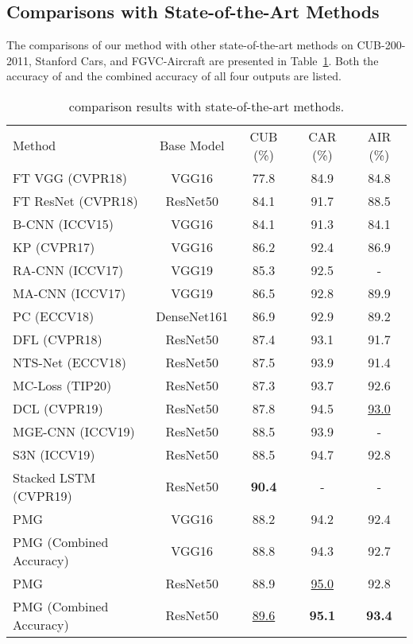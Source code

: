 \documentclass{llncs}
\begin{document}
\subsection{Comparisons with State-of-the-Art Methods}\label{ssec:sota}
The comparisons of our method with other state-of-the-art methods on CUB-200-2011, Stanford Cars, and FGVC-Aircraft are presented in Table~\ref{table:comparison}. Both the accuracy of  and the combined accuracy of all four outputs are listed.

\setlength{\tabcolsep}{4pt}
\begin{table}[!t]
\begin{center}
\caption{comparison results with state-of-the-art methods.}
\label{table:comparison}
\begin{tabular}{lcccc}
\hline\noalign{\smallskip}
Method & Base Model & CUB (\%) & CAR (\%) & AIR (\%)\\
\noalign{\smallskip}
\hline
\noalign{\smallskip}
FT VGG (CVPR18) \cite{wang2018learning} & VGG16 & 77.8 & 84.9 & 84.8\\
FT ResNet (CVPR18) \cite{wang2018learning} & ResNet50 & 84.1 & 91.7 & 88.5\\
B-CNN (ICCV15) \cite{lin2015bilinear} & VGG16 & 84.1 & 91.3 & 84.1\\
KP (CVPR17) \cite{cui2017kernel} & VGG16 & 86.2 & 92.4 & 86.9\\
RA-CNN (ICCV17) \cite{fu2017look} & VGG19 & 85.3 & 92.5 & -\\
MA-CNN (ICCV17) \cite{zheng2017learning} & VGG19 & 86.5 & 92.8 & 89.9\\
PC (ECCV18) \cite{dubey2018pairwise} & DenseNet161 & 86.9 & 92.9 & 89.2\\
DFL (CVPR18) \cite{wang2018learning} & ResNet50 & 87.4 & 93.1 & 91.7\\
NTS-Net (ECCV18) \cite{yang2018learning} & ResNet50 & 87.5 & 93.9 & 91.4\\
MC-Loss (TIP20) \cite{chang2019the} & ResNet50 & 87.3 & 93.7 & 92.6\\
DCL (CVPR19) \cite{chen2019destruction} & ResNet50 & 87.8 & 94.5 & \underline{93.0}\\
MGE-CNN (ICCV19) \cite{zhang2019learning} & ResNet50 & 88.5 & 93.9 & -\\
S3N (ICCV19) \cite{ding2019selective} & ResNet50 & 88.5 & 94.7 & 92.8\\
Stacked LSTM (CVPR19) \cite{ge2019weakly} & ResNet50 & {\bf 90.4} & - & -\\
\hline
PMG & VGG16 & 88.2 & 94.2 & 92.4\\
PMG (Combined Accuracy) & VGG16 & 88.8 & 94.3 & 92.7\\
PMG & ResNet50 & 88.9 & \underline{95.0} & 92.8\\
PMG (Combined Accuracy) & ResNet50 & \underline{89.6} & {\bf 95.1} & {\bf 93.4}\\
\hline
\end{tabular}
\end{center}
\end{table}
\setlength{\tabcolsep}{1.4pt}
\end{document}
